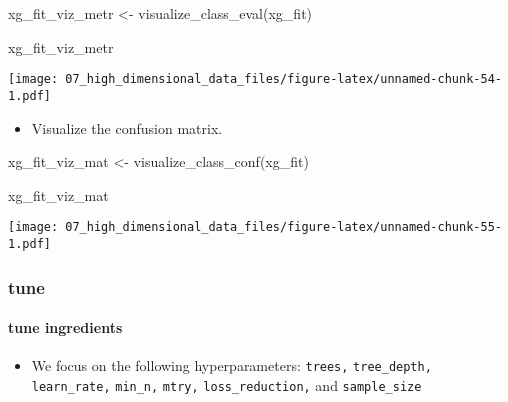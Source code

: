 \documentclass[
]{book}
\newenvironment{Shaded}{\begin{snugshade}}{\end{snugshade}}
\newcommand{\FunctionTok}[1]{\textcolor[rgb]{0.00,0.00,0.00}{#1}}
\newcommand{\NormalTok}[1]{#1}
\newcommand{\OtherTok}[1]{\textcolor[rgb]{0.56,0.35,0.01}{#1}}
\providecommand{\tightlist}{%
  \setlength{\itemsep}{0pt}\setlength{\parskip}{0pt}}
\begin{document}
\begin{Shaded}
\begin{Highlighting}[]
\NormalTok{xg\_fit\_viz\_metr }\OtherTok{\textless{}{-}} \FunctionTok{visualize\_class\_eval}\NormalTok{(xg\_fit)}

\NormalTok{xg\_fit\_viz\_metr}
\end{Highlighting}
\end{Shaded}

\texttt{[image: 07\_high\_dimensional\_data\_files/figure-latex/unnamed-chunk-54-1.pdf]}

\begin{itemize}
\tightlist
\item
  Visualize the confusion matrix.
\end{itemize}

\begin{Shaded}
\begin{Highlighting}[]
\NormalTok{xg\_fit\_viz\_mat }\OtherTok{\textless{}{-}} \FunctionTok{visualize\_class\_conf}\NormalTok{(xg\_fit)}

\NormalTok{xg\_fit\_viz\_mat}
\end{Highlighting}
\end{Shaded}

\texttt{[image: 07\_high\_dimensional\_data\_files/figure-latex/unnamed-chunk-55-1.pdf]}

\hypertarget{tune-3}{%
\subsubsection{tune}\label{tune-3}}

\hypertarget{tune-ingredients-3}{%
\paragraph{tune ingredients}\label{tune-ingredients-3}}

\begin{itemize}
\tightlist
\item
  We focus on the following hyperparameters: \texttt{trees,} \texttt{tree\_depth,} \texttt{learn\_rate,} \texttt{min\_n,} \texttt{mtry,} \texttt{loss\_reduction,} and \texttt{sample\_size}
\end{itemize}
\end{document}
